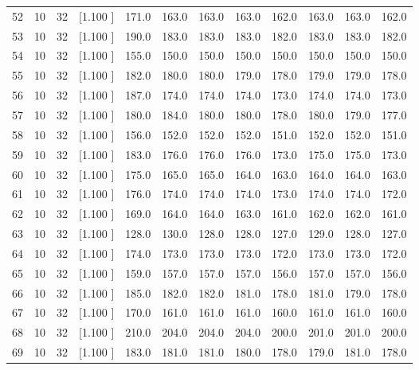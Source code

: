 \documentclass[12pt,a4paper]{article}
\begin{document}
\begin{center}
{\begin{tabular}{r r r r r r r r r r r r}
  52& 10& 32&[1.100     ]&   171.0&   163.0&   163.0&   163.0&   162.0&   163.0&   163.0&   162.0\\[-0.02in]
  53& 10& 32&[1.100     ]&   190.0&   183.0&   183.0&   183.0&   182.0&   183.0&   183.0&   182.0\\[-0.02in]
  54& 10& 32&[1.100     ]&   155.0&   150.0&   150.0&   150.0&   150.0&   150.0&   150.0&   150.0\\[-0.02in]
  55& 10& 32&[1.100     ]&   182.0&   180.0&   180.0&   179.0&   178.0&   179.0&   179.0&   178.0\\[-0.02in]
  56& 10& 32&[1.100     ]&   187.0&   174.0&   174.0&   174.0&   173.0&   174.0&   174.0&   173.0\\[-0.02in]
  57& 10& 32&[1.100     ]&   180.0&   184.0&   180.0&   180.0&   178.0&   180.0&   179.0&   177.0\\[-0.02in]
  58& 10& 32&[1.100     ]&   156.0&   152.0&   152.0&   152.0&   151.0&   152.0&   152.0&   151.0\\[-0.02in]
  59& 10& 32&[1.100     ]&   183.0&   176.0&   176.0&   176.0&   173.0&   175.0&   175.0&   173.0\\[-0.02in]
  60& 10& 32&[1.100     ]&   175.0&   165.0&   165.0&   164.0&   163.0&   164.0&   164.0&   163.0\\[-0.02in]
  61& 10& 32&[1.100     ]&   176.0&   174.0&   174.0&   174.0&   173.0&   174.0&   174.0&   172.0\\[-0.02in]
  62& 10& 32&[1.100     ]&   169.0&   164.0&   164.0&   163.0&   161.0&   162.0&   162.0&   161.0\\[-0.02in]
  63& 10& 32&[1.100     ]&   128.0&   130.0&   128.0&   128.0&   127.0&   129.0&   128.0&   127.0\\[-0.02in]
  64& 10& 32&[1.100     ]&   174.0&   173.0&   173.0&   173.0&   172.0&   173.0&   173.0&   172.0\\[-0.02in]
  65& 10& 32&[1.100     ]&   159.0&   157.0&   157.0&   157.0&   156.0&   157.0&   157.0&   156.0\\[-0.02in]
  66& 10& 32&[1.100     ]&   185.0&   182.0&   182.0&   181.0&   178.0&   181.0&   179.0&   178.0\\[-0.02in]
  67& 10& 32&[1.100     ]&   170.0&   161.0&   161.0&   161.0&   160.0&   161.0&   161.0&   160.0\\[-0.02in]
  68& 10& 32&[1.100     ]&   210.0&   204.0&   204.0&   204.0&   200.0&   201.0&   201.0&   200.0\\[-0.02in]
  69& 10& 32&[1.100     ]&   183.0&   181.0&   181.0&   180.0&   178.0&   179.0&   181.0&   178.0\\[-0.02in]

\end{tabular}}
\end{center}
\end{document}
